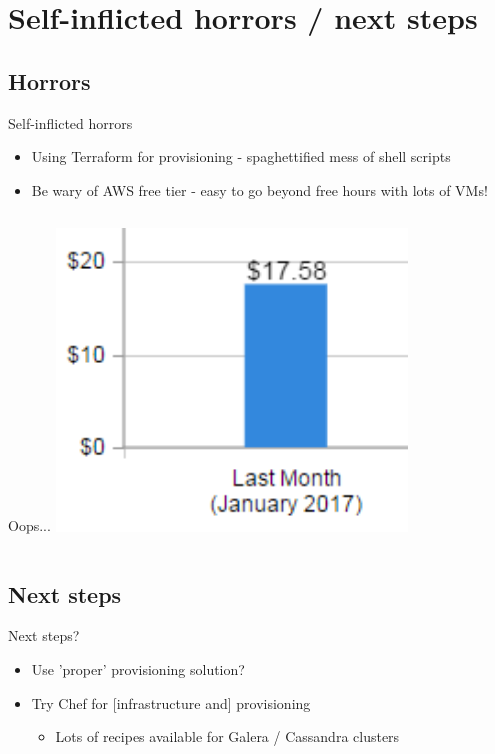 \documentclass[xcolor=dvipsnames]{beamer}
\begin{document}
\section[Mistakes / next steps]{Self-inflicted horrors / next steps}
\subsection{Horrors}
\begin{frame}{Self-inflicted horrors}
\begin{itemize}
  \item Using Terraform for provisioning - spaghettified mess of shell scripts
  \item Be wary of AWS free tier - easy to go beyond free hours with lots of VMs!
\end{itemize}
\pause
\begin{columns}
  \centering
  \begin{column}{0.5\textwidth}
    \begin{block}{Oops...}
      \centering
      \includegraphics[width=0.7\textwidth]{AWSbilling.png}
    \end{block}
  \end{column}
\end{columns}
\end{frame}

\subsection{Next steps}
\begin{frame}{Next steps?}
  \begin{itemize}
    \item Use 'proper' provisioning solution?
    \item Try Chef for [infrastructure and] provisioning
    \begin{itemize}
      \item Lots of recipes available for Galera / Cassandra clusters
    \end{itemize}
  \end{itemize}
\end{frame}
\end{document}
